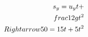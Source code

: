 \documentclass[preview]{standalone}
\begin{document}
\begin{align*}
\special{dvisvgm:raw <g id='unique000'>}s_y = u_y t + \\frac{1}{2}gt^2 \\Rightarrow 50 = 15t + 5t^2\special{dvisvgm:raw </g>}
\end{align*}
\end{document}
